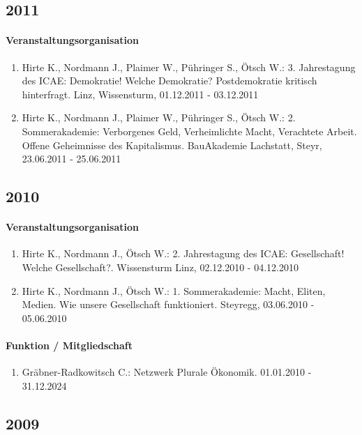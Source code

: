 \subsection*{2011}
\paragraph{Veranstaltungsorganisation}
\begin{enumerate}[leftmargin=*, labelsep=0.5cm]
\item Hirte K., Nordmann J., Plaimer W., Pühringer S., Ötsch W.: 3. Jahrestagung des ICAE: Demokratie! Welche Demokratie? Postdemokratie kritisch hinterfragt. Linz, Wissensturm, 01.12.2011 - 03.12.2011
\item Hirte K., Nordmann J., Plaimer W., Pühringer S., Ötsch W.: 2. Sommerakademie: Verborgenes Geld, Verheimlichte Macht, Verachtete Arbeit. Offene Geheimnisse des Kapitalismus. BauAkademie Lachstatt, Steyr, 23.06.2011 - 25.06.2011
\end{enumerate}
\subsection*{2010}
\paragraph{Veranstaltungsorganisation}
\begin{enumerate}[leftmargin=*, labelsep=0.5cm]
\item Hirte K., Nordmann J., Ötsch W.: 2. Jahrestagung des ICAE: Gesellschaft! Welche Gesellschaft?. Wissensturm Linz, 02.12.2010 - 04.12.2010
\item Hirte K., Nordmann J., Ötsch W.: 1. Sommerakademie: Macht, Eliten, Medien. Wie unsere Gesellschaft funktioniert. Steyregg, 03.06.2010 - 05.06.2010
\end{enumerate}

\paragraph{Funktion / Mitgliedschaft}
\begin{enumerate}[leftmargin=*, labelsep=0.5cm]
\item Gräbner-Radkowitsch C.: Netzwerk Plurale Ökonomik. 01.01.2010 - 31.12.2024
\end{enumerate}
\subsection*{2009}
